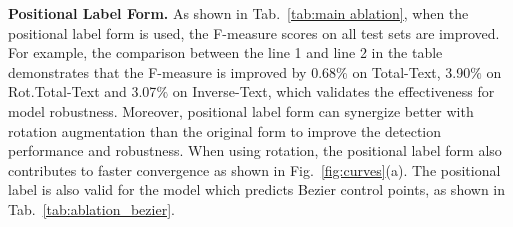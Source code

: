 \documentclass[letterpaper]{article} \usepackage{aaai23}  \usepackage{times}  \usepackage{helvet}  \usepackage{courier}  \usepackage[hyphens]{url}  \usepackage{graphicx} \urlstyle{rm}
\begin{document}
\begin{table}[t!]
    \centering
    \setlength{\tabcolsep}{4pt}
    \caption{Main ablation results of Bezier control point version detector on Total-Text, Rot.Total-Text, and Inverse-Text.}
    \label{tab:ablation_bezier}
\end{table}

\textbf{Positional Label Form.} As shown in Tab.~\ref{tab:main ablation}, when the positional label form is used, the F-measure scores on all test sets are improved. For example, the comparison between the line 1 and line 2 in the table demonstrates that the F-measure is improved by 0.68$\%$ on Total-Text, 3.90$\%$ on Rot.Total-Text and 3.07$\%$ on Inverse-Text, which validates the effectiveness for model robustness. Moreover, positional label form can synergize better with rotation augmentation than the original form to improve the detection performance and robustness. When using rotation, the positional label form also contributes to faster convergence as shown in Fig.~\ref{fig:curves}(a). The positional label is also valid for the model which predicts Bezier control points, as shown in Tab.~\ref{tab:ablation_bezier}.
\end{document}
